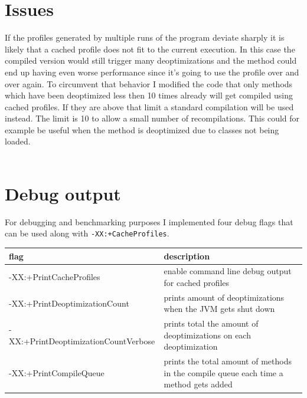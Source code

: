 \section{Issues}
\label{s:issues}
If the profiles generated by multiple runs of the program deviate sharply it is likely that a cached profile does not fit to the current execution. In this case the compiled version would still trigger many deoptimizations and the method could end up having even worse performance since it's going to use the profile over and over again.
To circumvent that behavior I modified the code that only methods which have been deoptimized less then 10 times already will get compiled using cached profiles. If they are above that limit a standard compilation will be used instead.
The limit is 10 to allow a small number of recompilations. This could for example be useful when the method is deoptimized due to classes not being loaded. 
\\\\

\section{Debug output}
\label{s:debugoutput}
For debugging and benchmarking purposes I implemented four debug flags that can be used along with \texttt{-XX:+CacheProfiles}.
\begin{table}[ht]
  \centering
  \label{t:debugflags}
  \begin{center}
    \begin{tabular}{| l | p{9.0cm} |}
       \hline
       \textbf{flag} & \textbf{description} \\ \hline\hline
       -XX:+PrintCacheProfiles & enable command line debug output for cached profiles\\ \hline
       -XX:+PrintDeoptimizationCount & prints amount of deoptimizations when the JVM gets shut down\\ \hline
       -XX:+PrintDeoptimizationCountVerbose & prints total the amount of deoptimizations on each deoptimization\\ \hline
       -XX:+PrintCompileQueue & prints the total amount of methods in the compile queue each time a method gets added \\ \hline
    \end{tabular}
  \end{center}
\end{table}

 
